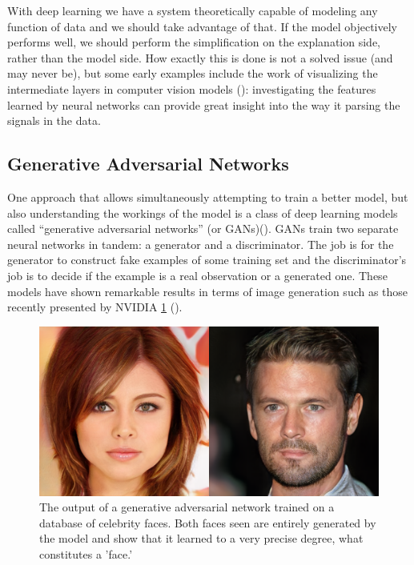 \documentclass[]{book}
\theoremstyle{definition}
\theoremstyle{definition}
\theoremstyle{definition}
\theoremstyle{remark}
\begin{document}
With deep learning we have a system theoretically capable of modeling
any function of data and we should take advantage of that. If the model
objectively performs well, we should perform the simplification on the
explanation side, rather than the model side. How exactly this is done
is not a solved issue (and may never be), but some early examples
include the work of visualizing the intermediate layers in computer
vision models (\citet{cnn_vis}): investigating the features learned by
neural networks can provide great insight into the way it parsing the
signals in the data.

\subsection{Generative Adversarial
Networks}\label{generative-adversarial-networks}

One approach that allows simultaneously attempting to train a better
model, but also understanding the workings of the model is a class of
deep learning models called ``generative adversarial networks'' (or
GANs)(\citet{gans}). GANs train two separate neural networks in tandem:
a generator and a discriminator. The job is for the generator to
construct fake examples of some training set and the discriminator's job
is to decide if the example is a real observation or a generated one.
These models have shown remarkable results in terms of image generation
such as those recently presented by NVIDIA \ref{fig:ganexample}
(\citet{progressive_gans}).

\begin{figure}

{\centering \includegraphics[width=0.8\linewidth]{figures/gan_example} 

}

\caption{The output of a generative adversarial network trained on a database of celebrity faces. Both faces seen are entirely generated by the model and show that it learned to a very precise degree, what constitutes a 'face.'}\label{fig:ganexample}
\end{figure}
\end{document}
